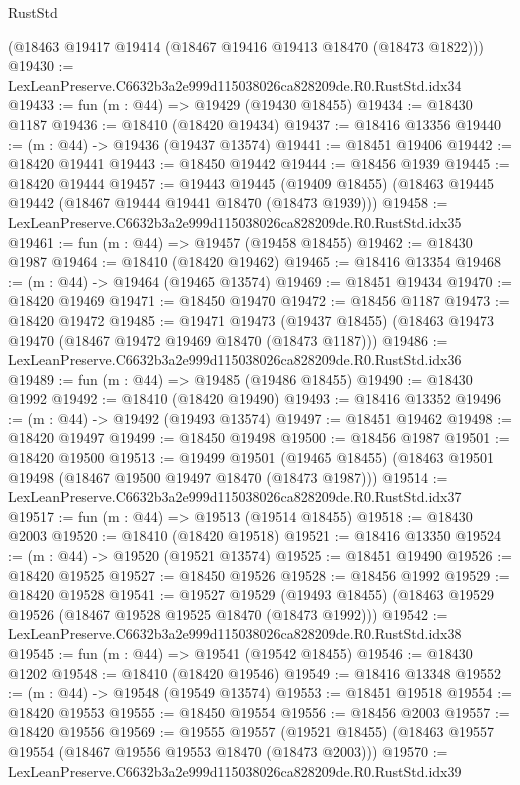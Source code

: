 \begin{lexlean}{RustStd}
\begin{coremodule}
    (@18463 @19417 @19414 (@18467 @19416 @19413 @18470 (@18473 @1822)))
@19430 := LexLeanPreserve.C6632b3a2e999d115038026ca828209de.R0.RustStd.idx34
@19433 := fun (m : @44) => @19429 (@19430 @18455)
@19434 := @18430 @1187
@19436 := @18410 (@18420 @19434)
@19437 := @18416 @13356
@19440 := (m : @44) -> @19436 (@19437 @13574)
@19441 := @18451 @19406
@19442 := @18420 @19441
@19443 := @18450 @19442
@19444 := @18456 @1939
@19445 := @18420 @19444
@19457 := @19443
    @19445
    (@19409 @18455)
    (@18463 @19445 @19442 (@18467 @19444 @19441 @18470 (@18473 @1939)))
@19458 := LexLeanPreserve.C6632b3a2e999d115038026ca828209de.R0.RustStd.idx35
@19461 := fun (m : @44) => @19457 (@19458 @18455)
@19462 := @18430 @1987
@19464 := @18410 (@18420 @19462)
@19465 := @18416 @13354
@19468 := (m : @44) -> @19464 (@19465 @13574)
@19469 := @18451 @19434
@19470 := @18420 @19469
@19471 := @18450 @19470
@19472 := @18456 @1187
@19473 := @18420 @19472
@19485 := @19471
    @19473
    (@19437 @18455)
    (@18463 @19473 @19470 (@18467 @19472 @19469 @18470 (@18473 @1187)))
@19486 := LexLeanPreserve.C6632b3a2e999d115038026ca828209de.R0.RustStd.idx36
@19489 := fun (m : @44) => @19485 (@19486 @18455)
@19490 := @18430 @1992
@19492 := @18410 (@18420 @19490)
@19493 := @18416 @13352
@19496 := (m : @44) -> @19492 (@19493 @13574)
@19497 := @18451 @19462
@19498 := @18420 @19497
@19499 := @18450 @19498
@19500 := @18456 @1987
@19501 := @18420 @19500
@19513 := @19499
    @19501
    (@19465 @18455)
    (@18463 @19501 @19498 (@18467 @19500 @19497 @18470 (@18473 @1987)))
@19514 := LexLeanPreserve.C6632b3a2e999d115038026ca828209de.R0.RustStd.idx37
@19517 := fun (m : @44) => @19513 (@19514 @18455)
@19518 := @18430 @2003
@19520 := @18410 (@18420 @19518)
@19521 := @18416 @13350
@19524 := (m : @44) -> @19520 (@19521 @13574)
@19525 := @18451 @19490
@19526 := @18420 @19525
@19527 := @18450 @19526
@19528 := @18456 @1992
@19529 := @18420 @19528
@19541 := @19527
    @19529
    (@19493 @18455)
    (@18463 @19529 @19526 (@18467 @19528 @19525 @18470 (@18473 @1992)))
@19542 := LexLeanPreserve.C6632b3a2e999d115038026ca828209de.R0.RustStd.idx38
@19545 := fun (m : @44) => @19541 (@19542 @18455)
@19546 := @18430 @1202
@19548 := @18410 (@18420 @19546)
@19549 := @18416 @13348
@19552 := (m : @44) -> @19548 (@19549 @13574)
@19553 := @18451 @19518
@19554 := @18420 @19553
@19555 := @18450 @19554
@19556 := @18456 @2003
@19557 := @18420 @19556
@19569 := @19555
    @19557
    (@19521 @18455)
    (@18463 @19557 @19554 (@18467 @19556 @19553 @18470 (@18473 @2003)))
@19570 := LexLeanPreserve.C6632b3a2e999d115038026ca828209de.R0.RustStd.idx39

\end{coremodule}
\end{lexlean}
